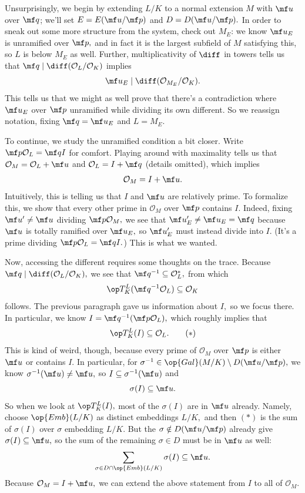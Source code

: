Unsurprisingly, we begin by extending $L/K$ to a normal extension $M$ with $\mf u$ over $\mf q$; we'll set $E=E(\mf u/\mf p)$ and $D=D(\mf u/\mf p).$ In order to sneak out some more structure from the system, check out $M_E$: we know $\mf u_E$ is unramified over $\mf p,$ and in fact it is the largest subfield of $M$ satisfying this, so $L$ is below $M_E$ as well. Further, multiplicativity of $\diff$ in towers tells us that $\mf q\mid\diff(\mathcal O_L/\mathcal O_K)$ implies
\[\mf u_E\mid\diff(\mathcal O_{M_E}/\mathcal O_K).\]
This tells us that we might as well prove that there's a contradiction where $\mf u_E$ over $\mf p$ unramified while dividing its own different. So we reassign notation, fixing $\mf q=\mf u_E$ and $L=M_E.$

To continue, we study the unramified condition a bit closer. Write $\mf p\mathcal O_L=\mf qI$ for comfort. Playing around with maximality tells us that $\mathcal O_M=\mathcal O_L+\mf u$ and $\mathcal O_L=I+\mf q$ (details omitted), which implies
\[\mathcal O_M=I+\mf u.\]
Intuitively, this is telling us that $I$ and $\mf u$ are relatively prime. To formalize this, we show that every other prime in $\mathcal O_M$ over $\mf p$ contains $I.$ Indeed, fixing $\mf u'\ne\mf u$ dividing $\mf p\mathcal O_M,$ we see that $\mf u'_E\ne\mf u_E=\mf q$ because $\mf u$ is totally ramified over $\mf u_E,$ so $\mf u'_E$ must instead divide into $I.$ (It's a prime dividing $\mf p\mathcal O_L=\mf qI.$) This is what we wanted.

Now, accessing the different requires some thoughts on the trace. Because $\mf q\mid\diff(\mathcal O_L/\mathcal O_K),$ we see that $\mf q^{-1}\subseteq\mathcal O_L^*,$ from which
\[\op T_K^L(\mf q^{-1}\mathcal O_L)\subseteq\mathcal O_K\]
follows. The previous paragraph gave us information about $I,$ so we focus there. In particular, we know $I=\mf q^{-1}(\mf p\mathcal O_L),$ which roughly implies that
\[\op T_K^L(I)\subseteq\mathcal O_L.\tag{$*$}\]
This is kind of weird, though, because every prime of $\mathcal O_M$ over $\mf p$ is either $\mf u$ or contains $I.$ In particular, for $\sigma^{-1}\in\op{Gal}(M/K)\setminus D(\mf u/\mf p),$ we know $\sigma^{-1}(\mf u)\ne\mf u,$ so $I\subseteq\sigma^{-1}(\mf u)$ and
\[\sigma(I)\subseteq\mf u.\]
So when we look at $\op T_K^L(I),$ most of the $\sigma(I)$ are in $\mf u$ already. Namely, choose $\op{Emb}(L/K)$ as distinct embeddings $L/K,$ and then $(*)$ is the sum of $\sigma(I)$ over $\sigma$ embedding $L/K.$ But the $\sigma\notin D(\mf u/\mf p)$ already give $\sigma(I)\subseteq\mf u,$ so the sum of the remaining $\sigma\in D$ must be in $\mf u$ as well:
\[\sum_{\sigma\in D\cap\op{Emb}(L/K)}\sigma(I)\subseteq\mf u.\]
Because $\mathcal O_M=I+\mf u,$ we can extend the above statement from $I$ to all of $\mathcal O_M.$

